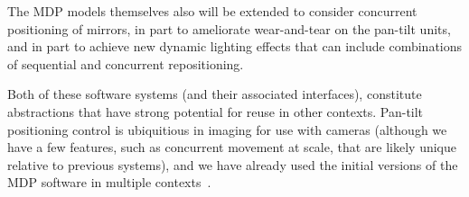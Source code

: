 The MDP models themselves also will be extended to consider concurrent positioning of mirrors, in
part to ameliorate wear-and-tear on the pan-tilt units, and in part to achieve new dynamic
lighting effects that can include combinations of sequential and concurrent repositioning.

Both of these software systems (and their associated interfaces), constitute
abstractions that have strong potential for reuse in other contexts.
Pan-tilt positioning control is ubiquitious in imaging for use
with cameras (although we have a few features, such as concurrent movement
at scale, that are likely unique relative to previous systems),
and we have already used the initial versions of the MDP
software in multiple contexts~\cite{mskgct13,tggs10}.
